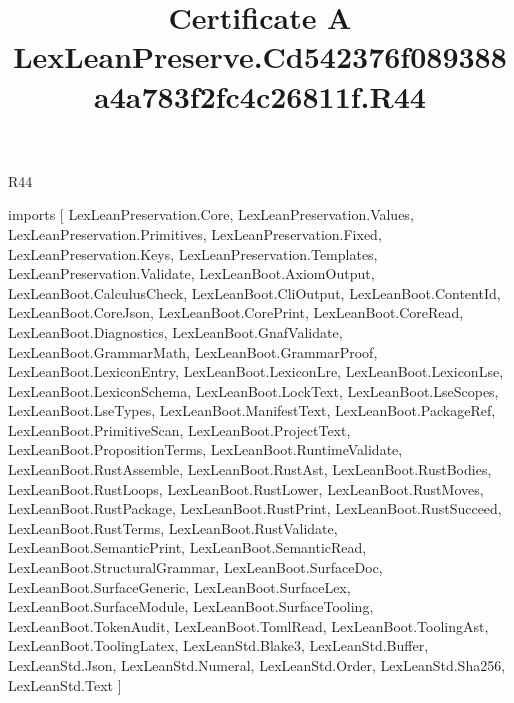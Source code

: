 \begin{lexlean}{R44}
\title{Certificate A LexLeanPreserve.Cd542376f089388a4a783f2fc4c26811f.R44}
\begin{coremodule}
imports [
  LexLeanPreservation.Core,
  LexLeanPreservation.Values,
  LexLeanPreservation.Primitives,
  LexLeanPreservation.Fixed,
  LexLeanPreservation.Keys,
  LexLeanPreservation.Templates,
  LexLeanPreservation.Validate,
  LexLeanBoot.AxiomOutput,
  LexLeanBoot.CalculusCheck,
  LexLeanBoot.CliOutput,
  LexLeanBoot.ContentId,
  LexLeanBoot.CoreJson,
  LexLeanBoot.CorePrint,
  LexLeanBoot.CoreRead,
  LexLeanBoot.Diagnostics,
  LexLeanBoot.GnafValidate,
  LexLeanBoot.GrammarMath,
  LexLeanBoot.GrammarProof,
  LexLeanBoot.LexiconEntry,
  LexLeanBoot.LexiconLre,
  LexLeanBoot.LexiconLse,
  LexLeanBoot.LexiconSchema,
  LexLeanBoot.LockText,
  LexLeanBoot.LseScopes,
  LexLeanBoot.LseTypes,
  LexLeanBoot.ManifestText,
  LexLeanBoot.PackageRef,
  LexLeanBoot.PrimitiveScan,
  LexLeanBoot.ProjectText,
  LexLeanBoot.PropositionTerms,
  LexLeanBoot.RuntimeValidate,
  LexLeanBoot.RustAssemble,
  LexLeanBoot.RustAst,
  LexLeanBoot.RustBodies,
  LexLeanBoot.RustLoops,
  LexLeanBoot.RustLower,
  LexLeanBoot.RustMoves,
  LexLeanBoot.RustPackage,
  LexLeanBoot.RustPrint,
  LexLeanBoot.RustSucceed,
  LexLeanBoot.RustTerms,
  LexLeanBoot.RustValidate,
  LexLeanBoot.SemanticPrint,
  LexLeanBoot.SemanticRead,
  LexLeanBoot.StructuralGrammar,
  LexLeanBoot.SurfaceDoc,
  LexLeanBoot.SurfaceGeneric,
  LexLeanBoot.SurfaceLex,
  LexLeanBoot.SurfaceModule,
  LexLeanBoot.SurfaceTooling,
  LexLeanBoot.TokenAudit,
  LexLeanBoot.TomlRead,
  LexLeanBoot.ToolingAst,
  LexLeanBoot.ToolingLatex,
  LexLeanStd.Blake3,
  LexLeanStd.Buffer,
  LexLeanStd.Json,
  LexLeanStd.Numeral,
  LexLeanStd.Order,
  LexLeanStd.Sha256,
  LexLeanStd.Text
]


\end{coremodule}
\end{lexlean}
